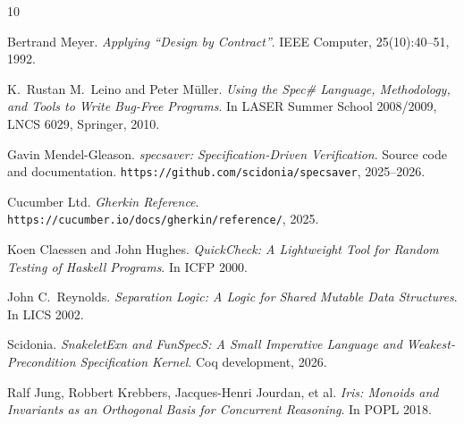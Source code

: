 \documentclass[11pt,a4paper]{article}
\begin{document}
\begin{thebibliography}{10}

Bertrand Meyer.
\textit{Applying ``Design by Contract''}.
IEEE Computer, 25(10):40--51, 1992.

K.\ Rustan M.\ Leino and Peter M\"uller.
\textit{Using the Spec\# Language, Methodology, and Tools to Write
Bug-Free Programs}.
In LASER Summer School 2008/2009, LNCS 6029, Springer, 2010.

Gavin Mendel-Gleason.
\textit{specsaver: Specification-Driven Verification}.
Source code and documentation. \texttt{https://github.com/scidonia/specsaver}, 2025--2026.

Cucumber Ltd.
\textit{Gherkin Reference}.
\texttt{https://cucumber.io/docs/gherkin/reference/}, 2025.

Koen Claessen and John Hughes.
\textit{QuickCheck: A Lightweight Tool for Random Testing of Haskell Programs}.
In ICFP 2000.

John C.\ Reynolds.
\textit{Separation Logic: A Logic for Shared Mutable Data Structures}.
In LICS 2002.

Scidonia.
\textit{SnakeletExn and FunSpecS: A Small Imperative Language and
Weakest-Precondition Specification Kernel}.
Coq development, 2026.

Ralf Jung, Robbert Krebbers, Jacques-Henri Jourdan, et al.
\textit{Iris: Monoids and Invariants as an Orthogonal Basis for
Concurrent Reasoning}.  In POPL 2018.

\end{thebibliography}
\end{document}
